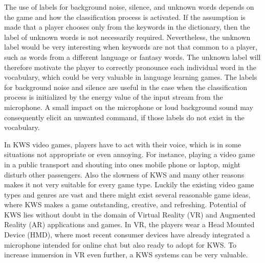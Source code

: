 The use of labels for background noise, silence, and unknown words depends on the game and how the classification process is activated.
If the assumption is made that a player chooses only from the keywords in the dictionary, then the label of unknown words is not necessarily required.
Nevertheless, the unknown label would be very interesting when keywords are not that common to a player, such as words from a different language or fantasy words.
The unknown label will therefore motivate the player to correctly pronounce each individual word in the vocabulary, which could be very valuable in language learning games.
The labels for background noise and silence are useful in the case when the classification process is initialized by the energy value of the input stream from the microphone.
A small impact on the microphone or loud background sound may consequently elicit an unwanted command, if those labels do not exist in the vocabulary.

In KWS video games, players have to act with their voice, which is in some situations not appropriate or even annoying.
For instance, playing a video game in a public transport and shouting into ones mobile phone or laptop, might disturb other passengers.
Also the slowness of KWS and many other reasons makes it not very suitable for every game type.
Luckily the existing video game types and genres are vast and there might exist several reasonable game ideas, where KWS makes a game outstanding, creative, and refreshing.
Potential of KWS lies without doubt in the domain of Virtual Reality (VR) and Augmented Reality (AR) applications and games.
In VR, the players wear a Head Mounted Device (HMD), where most recent consumer devices have already integrated a microphone intended for online chat but also ready to adopt for KWS.
To increase immersion in VR even further, a KWS systems can be very valuable.